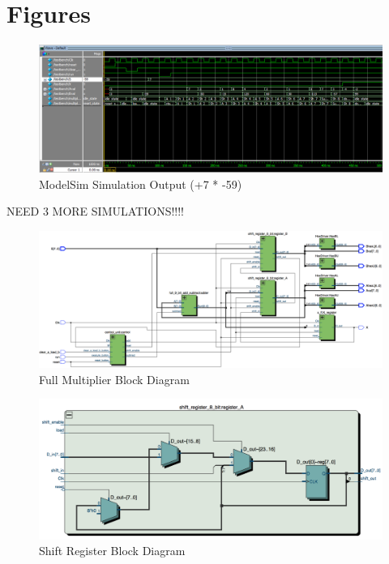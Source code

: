 \documentclass[journal, twocolumn, final,11pt,letterpaper]{IEEEtran}
\begin{document}
\clearpage
\onecolumn
\section{Figures}

\begin{figure} [htbp]
	\centering
	\includegraphics[scale=0.4]{simulation-output.png}
	\caption{ModelSim Simulation Output (+7 * -59)\label{fig:simulation-output}}
\end{figure}
NEED 3 MORE SIMULATIONS!!!!

\begin{figure} [htbp]
	\centering
	\includegraphics[scale=0.4]{full-multiplier-diagram.png}
	\caption{Full Multiplier Block Diagram\label{fig:full-multiplier-diagram}}
\end{figure}

\begin{figure} [htbp]
	\centering
	\includegraphics[scale=0.5]{shift-register-diagram.png}
	\caption{Shift Register Block Diagram\label{fig:shift-register-diagram}}
\end{figure}
\end{document}
